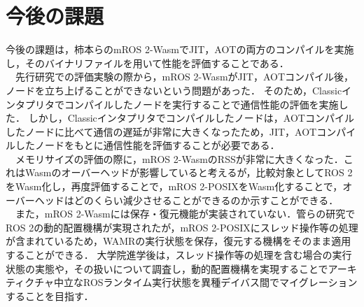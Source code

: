 \section{今後の課題}
今後の課題は，柿本らのmROS 2-WasmでJIT，AOTの両方のコンパイルを実施し，そのバイナリファイルを用いて性能を評価することである．
\\　先行研究での評価実験の際から，mROS 2-WasmがJIT，AOTコンパイル後，ノードを立ち上げることができないという問題があった．
そのため，Classicインタプリタでコンパイルしたノードを実行することで通信性能の評価を実施した．
しかし，Classicインタプリタでコンパイルしたノードは，AOTコンパイルしたノードに比べて通信の遅延が非常に大きくなったため，JIT，AOTコンパイルしたノードをもとに通信性能を評価することが必要である．
\\　メモリサイズの評価の際に，mROS 2-WasmのRSSが非常に大きくなった．これはWasmのオーバーヘッドが影響していると考えるが，比較対象としてROS 2をWasm化し，再度評価することで，mROS 2-POSIXをWasm化することで，オーバーヘッドはどのくらい減少させることができるのか示すことができる．
\\　また，mROS 2-Wasmには保存・復元機能が実装されていない．管らの研究でROS 2の動的配置機構が実現されたが，mROS 2-POSIXにスレッド操作等の処理が含まれているため，WAMRの実行状態を保存，復元する機構をそのまま適用することができる．
大学院進学後は，スレッド操作等の処理を含む場合の実行状態の実態や，その扱いについて調査し，動的配置機構を実現することでアーキティクチャ中立なROSランタイム実行状態を異種デイバス間でマイグレーションすることを目指す．
